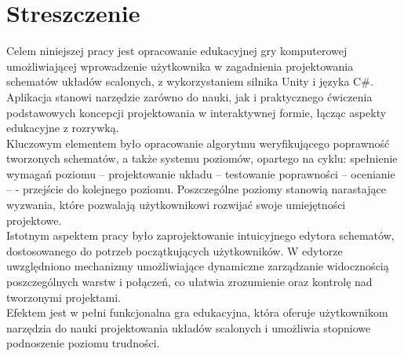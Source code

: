 \section*{Streszczenie}
\thispagestyle{plain}
Celem niniejszej pracy jest opracowanie edukacyjnej gry komputerowej umożliwiającej wprowadzenie użytkownika
w zagadnienia projektowania schematów układów scalonych,
z wykorzystaniem silnika Unity i języka C\#.
Aplikacja stanowi narzędzie zarówno do nauki,
jak i praktycznego ćwiczenia podstawowych koncepcji projektowania w interaktywnej formie,
łącząc aspekty edukacyjne z rozrywką.\\
\indent %
Kluczowym elementem było opracowanie algorytmu weryfikującego
poprawność tworzonych schematów,
a także systemu poziomów,
opartego na cyklu: spełnienie wymagań poziomu – projektowanie układu – testowanie poprawności – ocenianie – \linebreak
- przejście
do kolejnego poziomu.
Poszczególne poziomy stanowią narastające wyzwania,
które pozwalają użytkownikowi rozwijać swoje umiejętności projektowe.\\
\indent Istotnym aspektem pracy było zaprojektowanie intuicyjnego edytora schema\-tów,
dostosowanego do potrzeb początkujących użytkowników.
W edytorze uwzględniono mechanizmy umożliwiające dynamiczne zarządzanie widocznością poszczególnych warstw i połączeń,
co ułatwia zrozumienie oraz kontrolę nad tworzonymi projektami.\\
\indent Efektem jest w pełni funkcjonalna gra edukacyjna,
która oferuje użytkownikom narzędzia do nauki projektowania układów scalonych
i umożliwia stopniowe podnoszenie poziomu trudności.
